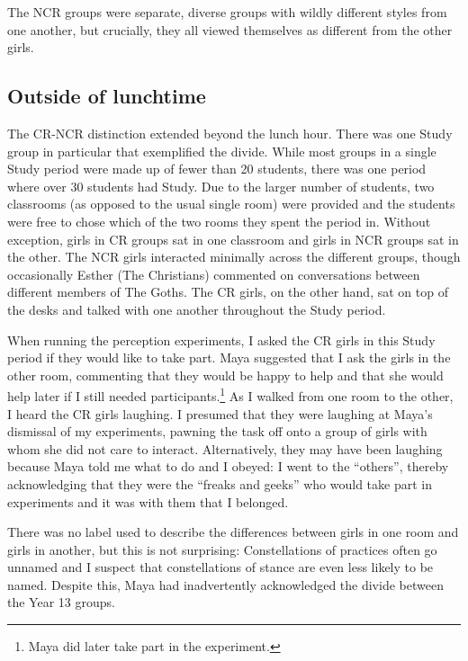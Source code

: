 \largerpage

 The NCR groups were separate, diverse groups with wildly different styles from one another, but crucially, they all viewed themselves as different from the other girls. 


\subsection{Outside of lunchtime}

The CR-NCR distinction extended beyond the lunch hour. There was one Study group in particular that exemplified the divide. While most groups in a single Study period were made up of fewer than 20 students, there was one period where over 30 students had Study. Due to the larger number of students, two classrooms (as opposed to the usual single room) were provided and the students were free to chose which of the two rooms they spent the period in. Without exception, girls in CR groups sat in one classroom and girls in NCR groups sat in the other. The NCR girls interacted minimally across the different groups, though occasionally Esther (The Christians) commented on conversations between different members of The Goths. The CR girls, on the other hand, sat on top of the desks and talked with one another throughout the Study period.

When running the perception experiments, I asked the CR girls in this Study period if they would like to take part. Maya suggested that I ask the girls in the other room, commenting that they would be happy to help and that she would help later if I still needed participants.\footnote{Maya did later take part in the experiment.}  As I walked from one room to the other, I heard the CR girls laughing. I presumed that they were laughing at Maya's dismissal of my experiments, pawning the task off onto a group of girls with whom she did not care to interact. Alternatively, they may have been laughing because Maya told me what to do and I obeyed: I went to the ``others'', thereby acknowledging that they were the ``freaks and geeks'' who would take part in experiments and it was with them that I belonged. 

There was no label used to describe the differences between girls in one room and girls in another, but this is not surprising: Constellations of practices often go unnamed \citep[128]{wenger1998} and I suspect that constellations of stance are even less likely to be named. Despite this, Maya had inadvertently acknowledged the divide between the Year 13 groups.



